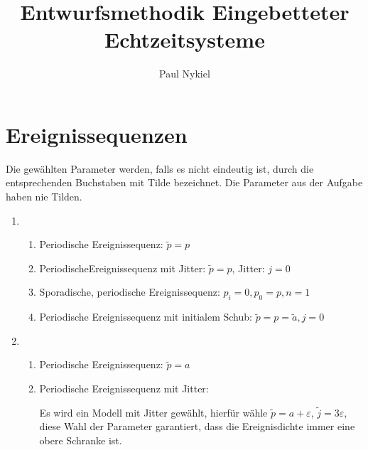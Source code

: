 \documentclass[DIN, pagenumber=false, fontsize=11pt, parskip=half]{scrartcl}
\title{Entwurfsmethodik Eingebetteter Echtzeitsysteme}
\author{Paul Nykiel}
\begin{document}
    \maketitle
    \section{Ereignissequenzen}
    Die gewählten Parameter werden, falls es nicht eindeutig ist, durch die entsprechenden
    Buchstaben mit Tilde bezeichnet. Die Parameter aus der Aufgabe haben nie Tilden.
    \begin{enumerate}[label=\roman*)]
        \item
            \begin{enumerate}[label=\alph*)]
                \item Periodische Ereignissequenz: $\tilde{p}=p$
                \item PeriodischeEreignissequenz mit Jitter: $\tilde{p}=p$, Jitter: $j=0$
                \item Sporadische, periodische Ereignissequenz: $p_i=0, p_0=p, n=1$
                \item Periodische Ereignissequenz mit initialem Schub: $\tilde{p}=p=\tilde{a}, j=0$
            \end{enumerate} 
        \item
            \begin{enumerate}[label=\alph*)]
                \item Periodische Ereignissequenz: $\tilde{p}=a$
                \item Periodische Ereignissequenz mit Jitter:
                    
                    Es wird ein Modell mit Jitter gewählt, hierfür wähle $\tilde{p}=a+\varepsilon$,
                    $\tilde{j}=3 \varepsilon$, diese Wahl der Parameter garantiert, dass
                    die Ereignisdichte immer eine obere Schranke ist.


\end{enumerate}
\end{enumerate}
\end{document}
